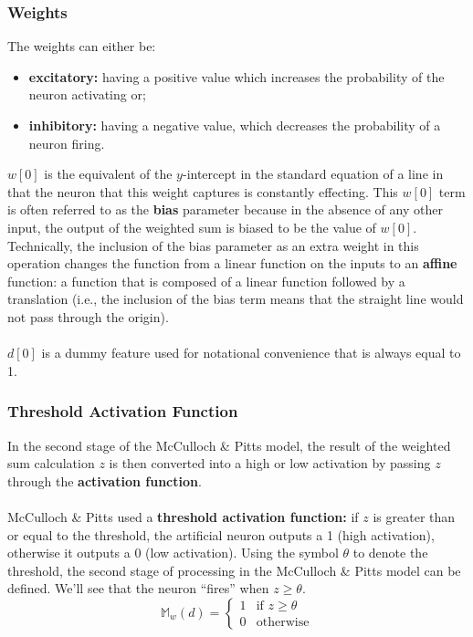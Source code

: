 \documentclass[a4paper,11pt]{article}
\begin{document}
\subsubsection{Weights}
The weights can either be:
\begin{itemize}
    \item   \textbf{excitatory:} having a positive value which increases the probability of the neuron activating or;
    \item   \textbf{inhibitory:} having a negative value, which decreases the probability of a neuron firing.
\end{itemize}

$w[0]$ is the equivalent of the $y$-intercept in the standard equation of a line in that the neuron that this weight captures is constantly effecting.
This $w[0]$ term is often referred to as the \textbf{bias} parameter because in the absence of any other input, the output of the weighted sum is biased to be the value of $w[0]$.
Technically, the inclusion of the bias parameter as an extra weight in this operation changes the function from a linear function on the inputs to an \textbf{affine} function: a function that is composed of a linear function followed by a translation (i.e., the inclusion of the bias term means that the straight line would not pass through the origin).
\\\\
$d[0]$ is a dummy feature used for notational convenience that is always equal to 1.

\subsubsection{Threshold Activation Function}
In the second stage of the McCulloch \& Pitts model, the result of the weighted sum calculation $z$ is then converted into a high or low activation by passing $z$ through the \textbf{activation function}.
\\\\
McCulloch \& Pitts used a \textbf{threshold activation function:} if $z$ is greater than or equal to the threshold, the artificial neuron outputs a 1 (high activation), otherwise it outputs a 0 (low activation).
Using the symbol $\theta$ to denote the threshold, the second stage of processing in the McCulloch \& Pitts model can be defined.
We'll see that the neuron ``fires'' when $z \geq \theta$.
\[
    \mathbb{M}_w(d) = 
    \begin{cases}
        1 & \text{if } z \geq \theta \\
        0 & \text{otherwise}
    \end{cases}
\]
\end{document}
